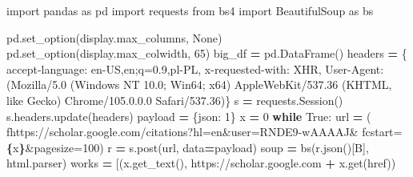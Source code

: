 \documentclass[
  12pt,
]{article}
\newenvironment{Shaded}{\begin{snugshade}}{\end{snugshade}}
\newcommand{\ControlFlowTok}[1]{\textcolor[rgb]{0.13,0.29,0.53}{\textbf{#1}}}
\newcommand{\DecValTok}[1]{\textcolor[rgb]{0.00,0.00,0.81}{#1}}
\newcommand{\ImportTok}[1]{#1}
\newcommand{\NormalTok}[1]{#1}
\newcommand{\OperatorTok}[1]{\textcolor[rgb]{0.81,0.36,0.00}{\textbf{#1}}}
\newcommand{\SpecialCharTok}[1]{\textcolor[rgb]{0.81,0.36,0.00}{\textbf{#1}}}
\newcommand{\SpecialStringTok}[1]{\textcolor[rgb]{0.31,0.60,0.02}{#1}}
\newcommand{\StringTok}[1]{\textcolor[rgb]{0.31,0.60,0.02}{#1}}
\newcommand{\VariableTok}[1]{\textcolor[rgb]{0.00,0.00,0.00}{#1}}
\begin{document}
\begin{Shaded}
\begin{Highlighting}[]
\ImportTok{import}\NormalTok{ pandas }\ImportTok{as}\NormalTok{ pd}
\ImportTok{import}\NormalTok{ requests}
\ImportTok{from}\NormalTok{ bs4 }\ImportTok{import}\NormalTok{ BeautifulSoup }\ImportTok{as}\NormalTok{ bs}

\NormalTok{pd.set\_option(}\StringTok{\textquotesingle{}display.max\_columns\textquotesingle{}}\NormalTok{, }\VariableTok{None}\NormalTok{)}
\NormalTok{pd.set\_option(}\StringTok{\textquotesingle{}display.max\_colwidth\textquotesingle{}}\NormalTok{, }\DecValTok{65}\NormalTok{)}
\NormalTok{big\_df }\OperatorTok{=}\NormalTok{ pd.DataFrame()}
\NormalTok{headers }\OperatorTok{=}\NormalTok{ \{}
    \StringTok{\textquotesingle{}accept{-}language\textquotesingle{}}\NormalTok{: }\StringTok{\textquotesingle{}en{-}US,en;q=0.9,pl{-}PL\textquotesingle{}}\NormalTok{,}
    \StringTok{\textquotesingle{}x{-}requested{-}with\textquotesingle{}}\NormalTok{: }\StringTok{\textquotesingle{}XHR\textquotesingle{}}\NormalTok{,}
    \StringTok{\textquotesingle{}User{-}Agent\textquotesingle{}}\NormalTok{: (}\StringTok{\textquotesingle{}Mozilla/5.0 (Windows NT 10.0; Win64; x64) \textquotesingle{}}
                   \StringTok{\textquotesingle{}AppleWebKit/537.36 (KHTML, like Gecko) \textquotesingle{}}
                   \StringTok{\textquotesingle{}Chrome/105.0.0.0 Safari/537.36\textquotesingle{}}\NormalTok{)\}}
\NormalTok{s }\OperatorTok{=}\NormalTok{ requests.Session()}
\NormalTok{s.headers.update(headers)}
\NormalTok{payload }\OperatorTok{=}\NormalTok{ \{}\StringTok{\textquotesingle{}json\textquotesingle{}}\NormalTok{: }\StringTok{\textquotesingle{}1\textquotesingle{}}\NormalTok{\}}
\NormalTok{x }\OperatorTok{=} \DecValTok{0}
\ControlFlowTok{while} \VariableTok{True}\NormalTok{:}
\NormalTok{    url }\OperatorTok{=}\NormalTok{ (}
    \SpecialStringTok{f\textquotesingle{}https://scholar.google.com/citations?hl=en\&user=RNDE9{-}wAAAAJ\&\textquotesingle{}}
    \SpecialStringTok{f\textquotesingle{}cstart=}\SpecialCharTok{\{}\NormalTok{x}\SpecialCharTok{\}}\SpecialStringTok{\&pagesize=100\textquotesingle{}}\NormalTok{)}
\NormalTok{    r }\OperatorTok{=}\NormalTok{ s.post(url, data}\OperatorTok{=}\NormalTok{payload)}
\NormalTok{    soup }\OperatorTok{=}\NormalTok{ bs(r.json()[}\StringTok{\textquotesingle{}B\textquotesingle{}}\NormalTok{], }\StringTok{\textquotesingle{}html.parser\textquotesingle{}}\NormalTok{)}
\NormalTok{    works }\OperatorTok{=}\NormalTok{ [(x.get\_text(), }\StringTok{\textquotesingle{}https://scholar.google.com\textquotesingle{}} \OperatorTok{+}\NormalTok{ x.get(}\StringTok{\textquotesingle{}href\textquotesingle{}}\NormalTok{))}

\end{Highlighting}
\end{Shaded}
\end{document}
